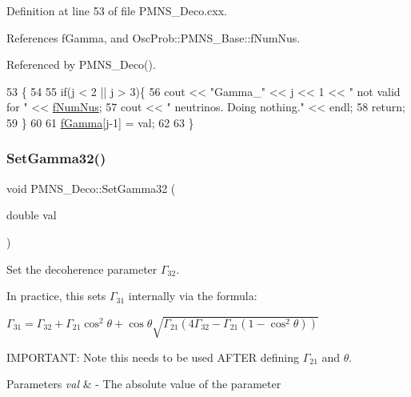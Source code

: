 Definition at line 53 of file P\+M\+N\+S\+\_\+\+Deco.\+cxx.



References f\+Gamma, and Osc\+Prob\+::\+P\+M\+N\+S\+\_\+\+Base\+::f\+Num\+Nus.



Referenced by P\+M\+N\+S\+\_\+\+Deco().


\begin{DoxyCode}
53                                          \{
54 
55   \textcolor{keywordflow}{if}(j < 2 || j > 3)\{
56     cout << \textcolor{stringliteral}{"Gamma\_"} << j << 1 << \textcolor{stringliteral}{" not valid for "} << \hyperlink{classOscProb_1_1PMNS__Base_a24bb74bed63569dfe88b18fa6a08060e}{fNumNus};
57     cout << \textcolor{stringliteral}{" neutrinos. Doing nothing."} << endl;
58     \textcolor{keywordflow}{return};
59   \}
60 
61   \hyperlink{classOscProb_1_1PMNS__Deco_ae2f30ac9f8b25344959f1698616d337a}{fGamma}[j-1] = val;
62   
63 \}
\end{DoxyCode}
\mbox{\label{classOscProb_1_1PMNS__Deco_a1bc2d1fb1bab9841baa37eecc0135fe9}} 
\subsubsection{\texorpdfstring{Set\+Gamma32()}{SetGamma32()}}
{\footnotesize\ttfamily void P\+M\+N\+S\+\_\+\+Deco\+::\+Set\+Gamma32 (\begin{DoxyParamCaption}\item[{double}]{val }\end{DoxyParamCaption})\hspace{0.3cm}{\ttfamily [virtual]}}

Set the decoherence parameter $\Gamma_{32}$.

In practice, this sets $\Gamma_{31}$ internally via the formula\+:

$ \Gamma_{31} = \Gamma_{32} + \Gamma_{21} \cos^2\theta + \cos\theta \sqrt{\Gamma_{21} (4\Gamma_{32} - \Gamma_{21} (1 - \cos^2\theta))} $

I\+M\+P\+O\+R\+T\+A\+NT\+: Note this needs to be used A\+F\+T\+ER defining $\Gamma_{21}$ and $\theta$.


\begin{DoxyParams}{Parameters}
{\em val} & -\/ The absolute value of the parameter \\
\hline
\end{DoxyParams}


